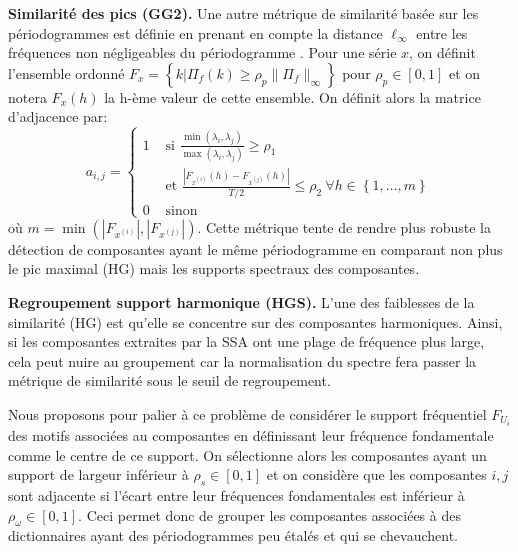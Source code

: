 \documentclass{gretsi}
\newcommand{\set}[1]{\left \{ 1, \dots, #1 \right \}}
\newcommand{\inter}{\left[0, 1\right]}
\begin{document}
\textbf{Similarité des pics (GG2).}\label{par:GG2}
    Une autre métrique de similarité basée sur les périodogrammes est définie en prenant en compte la distance $\ell_\infty$ entre les fréquences non négligeables du périodogramme \cite{abalov_14_auto}.
    Pour une série $x$, on définit l'ensemble ordonné $F_x = \left \{ k | \Pi_f(k) \ge \rho_p \|\Pi_f\|_\infty \right \}$ pour $\rho_p \in \inter$ et on notera $F_x(h)$ la h-ème valeur de cette ensemble.
    On définit alors la matrice d'adjacence par:
    \begin{equation}
        a_{i, j} = 
        \begin{cases}
	        1 & \text{ si } \displaystyle\frac{\min(\lambda_i, \lambda_j)}{\max(\lambda_i, \lambda_j)} \ge \rho_1\\
	          & \text{ et } \frac{|F_{x^{(i)}}(h) - F_{x^{(j)}}(h)|}{T/2} \le \rho_2\ \forall h \in \set{m}\\
	        0 & \text{ sinon}
        \end{cases}
    \end{equation} 
    où $m = \min\left(\left|F_{x^{(i)}}\right|, \left|F_{x^{(j)}}\right|\right)$.
    Cette métrique tente de rendre plus robuste la détection de composantes ayant le même périodogramme en comparant non plus le pic maximal (HG) mais les supports spectraux des composantes. 


\textbf{Regroupement support harmonique (HGS).}\label{par:HGS}
    L'une des faiblesses de la similarité (HG) est qu'elle se concentre sur des composantes harmoniques. 
    Ainsi, si les composantes extraites par la SSA ont une plage de fréquence plus large, cela peut nuire au groupement car la normalisation du spectre fera passer la métrique de similarité sous le seuil de regroupement.

    Nous proposons pour palier à ce problème de considérer le support fréquentiel $F_{U_i}$ des motifs associées au composantes en définissant leur fréquence fondamentale comme le centre de ce support.
    On sélectionne alors les composantes ayant un support de largeur inférieur à $\rho_s \in \inter$ et on considère que les composantes $i, j$ sont adjacente si l'écart entre leur fréquences fondamentales est inférieur à $\rho_\omega \in \inter$.
    Ceci permet donc de grouper les composantes associées à des dictionnaires ayant des périodogrammes peu étalés et qui se chevauchent.
\end{document}
